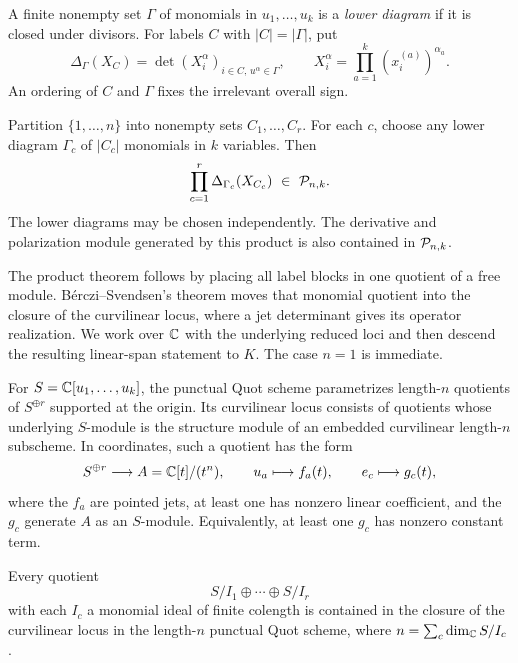 A finite nonempty set $\Gamma$ of monomials in $u_1,\ldots,u_k$ is a
\emph{lower diagram} if it is closed under divisors.
For labels $C$ with $|C|=|\Gamma|$, put
\[
 \Delta_\Gamma(X_C)=
       \det(X_i^\alpha)_{i\in C,\,u^\alpha\in\Gamma},
 \qquad
 X_i^\alpha=\prod_{a=1}^k(x_i^{(a)})^{\alpha_a}.
\]
An ordering of $C$ and $\Gamma$ fixes the irrelevant overall sign.

\begin{theorem}
\label{thm:r5-products}
Partition $\{1,\ldots,n\}$ into nonempty sets
$C_1,\ldots,C_r$.  For each $c$, choose any lower diagram
$\Gamma_c$ of $|C_c|$ monomials in $k$ variables.  Then
\begin{equation}\label{eq:r5-product}
       \prod_{c=1}^r\Delta_{\Gamma_c}(X_{C_c})
                         \ \in\ \mathcal P_{n,k}.
\end{equation}
The lower diagrams may be chosen independently.
The derivative and polarization module generated by this product is
also contained in $\mathcal P_{n,k}$.
\end{theorem}

The product theorem follows by placing all label blocks in one
quotient of a free module.  B\'erczi--Svendsen's theorem moves that
monomial quotient into the closure of the curvilinear locus, where
a jet determinant gives its operator realization.  We work over
$\mathbb C$ with the underlying reduced loci and then descend the resulting
linear-span statement to $K$.  The case $n=1$ is immediate.

For $S=\mathbb C[u_1,\ldots,u_k]$, the
punctual Quot scheme parametrizes length-$n$ quotients of $S^{\oplus r}$
supported at the origin.  Its curvilinear locus consists of quotients
whose underlying $S$-module is the structure module of an embedded
curvilinear length-$n$ subscheme.  In coordinates, such a quotient has
the form
\begin{equation}\label{eq:r5-curvilinear-quotient}
 S^{\oplus r}\longrightarrow A=\mathbb C[t]/(t^n),\qquad
 u_a\longmapsto f_a(t),\qquad e_c\longmapsto g_c(t),
\end{equation}
where the $f_a$ are pointed jets, at least one has nonzero linear
coefficient, and the $g_c$ generate $A$ as an $S$-module.  Equivalently,
at least one $g_c$ has nonzero constant term.

\begin{theorem}
\label{thm:r5-bs-input}
Every quotient
\[
               S/I_1\oplus\cdots\oplus S/I_r
\]
with each $I_c$ a monomial ideal of finite colength is contained in
the closure of the curvilinear locus in the length-$n$ punctual
Quot scheme, where $n=\sum_c\dim_\mathbb C S/I_c$.
\end{theorem}

